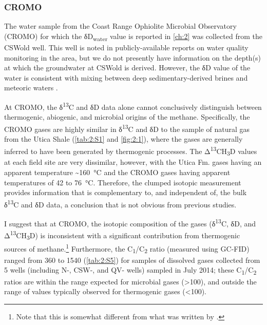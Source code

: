 \subsubsection{CROMO}\label{cromo}

The water sample from the Coast Range Ophiolite Microbial Observatory (CROMO) for which the δD\textsubscript{water} value
is reported in \autoref{ch:2} was collected from the CSWold well. This well
is noted in publicly-available reports on water quality monitoring in
the area, but we do not presently have information on the depth(s) at
which the groundwater at CSWold is derived. However, the δD value of the
water is consistent with mixing between deep sedimentary-derived brines
and meteoric waters \parencite{Peters_1993_GCA}.

At CROMO, the δ\textsuperscript{13}C and δD data alone cannot
conclusively distinguish between thermogenic, abiogenic, and microbial
origins of the methane. Specifically, the CROMO gases are highly similar
in δ\textsuperscript{13}C and δD to the sample of natural gas from the
Utica Shale (\autoref{tab:2:S1} and \autoref{fig:2:1}), where the gases are
generally inferred to have been generated by thermogenic processes. The
Δ\textsuperscript{13}CH\textsubscript{3}D values at each field site are
very dissimilar, however, with the Utica Fm. gases having an apparent
temperature \textasciitilde{}160~°C and the CROMO gases having apparent
temperatures of 42 to 76~°C. Therefore, the clumped isotopic measurement
provides information that is complementary to, and independent of, the
bulk δ\textsuperscript{13}C and δD data, a conclusion that is not
obvious from previous studies.

I suggest that at CROMO, the isotopic composition of the gases
(δ\textsuperscript{13}C, δD, and
Δ\textsuperscript{13}CH\textsubscript{3}D) is inconsistent with a
significant contribution from thermogenic sources of methane.\footnote{Note that this is somewhat different from what was written by \textcite{Wang++_2015_S}.}
Furthermore, the C\textsubscript{1}/C\textsubscript{2} ratio (measured
using GC-FID) ranged from 360 to 1540 (\autoref{tab:2:S5}) for
samples of dissolved gases collected from 5 wells (including N-, CSW-,
and QV- wells) sampled in July 2014; these
C\textsubscript{1}/C\textsubscript{2} ratios are within the range
expected for microbial gases (\textgreater{}100), and outside the range
of values typically observed for thermogenic gases (\textless{}100).

